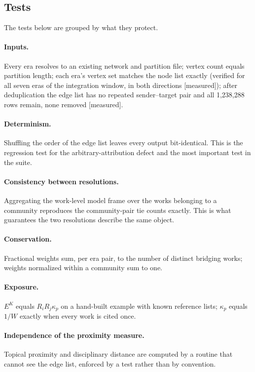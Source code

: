 \documentclass[11pt]{article}
\newcommand{\meas}{{\footnotesize\textsf{[measured]}}}
\begin{document}
\subsection{Tests}

The tests below are grouped by what they protect.

\paragraph{Inputs.} Every era resolves to an existing network and partition file; vertex
count equals partition length; each era's vertex set matches the node list exactly (verified
for all seven eras of the integration window, in both directions \meas{}); after deduplication the edge list has no repeated
sender--target pair and all 1{,}238{,}288 rows remain, none removed \meas{}.

\paragraph{Determinism.} Shuffling the order of the edge list leaves every output
bit-identical. This is the regression test for the arbitrary-attribution defect and the most
important test in the suite.

\paragraph{Consistency between resolutions.} Aggregating the work-level model frame over the
works belonging to a community reproduces the community-pair tie counts exactly. This is
what guarantees the two resolutions describe the same object.

\paragraph{Conservation.} Fractional weights sum, per era pair, to the number of distinct
bridging works; weights normalized within a community sum to one.

\paragraph{Exposure.} $E^{K}$ equals $R_iR_j\kappa_p$ on a hand-built example with known
reference lists; $\kappa_p$ equals $1/W$ exactly when every work is cited once.

\paragraph{Independence of the proximity measure.} Topical proximity and disciplinary
distance are computed by a routine that cannot see the edge list, enforced by a test rather
than by convention.
\end{document}
